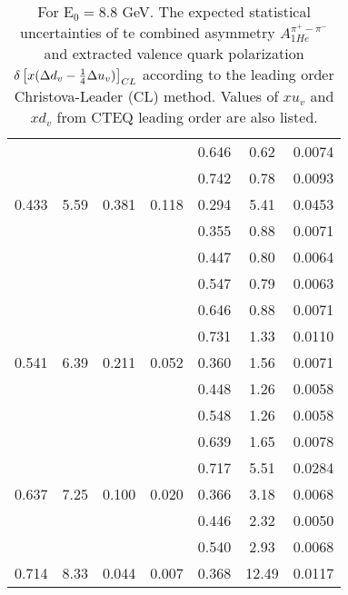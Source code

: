 \begin{table}[htbp]
\begin{center}
\begin{tabular}{|ccccc||c|c|}
         &          &          &          &    0.646 &      0.62 &    0.0074 \\
         &          &          &          &    0.742 &      0.78 &    0.0093 \\
   0.433 &    5.59 &   0.381 &    0.118 &    0.294 &      5.41 &    0.0453 \\
         &          &          &          &    0.355 &      0.88 &    0.0071 \\
         &          &          &          &    0.447 &      0.80 &    0.0064 \\
         &          &          &          &    0.547 &      0.79 &    0.0063 \\
         &          &          &          &    0.646 &      0.88 &    0.0071 \\
         &          &          &          &    0.731 &      1.33 &    0.0110 \\
   0.541 &    6.39 &   0.211 &    0.052 &    0.360 &      1.56 &    0.0071 \\
         &          &          &          &    0.448 &      1.26 &    0.0058 \\
         &          &          &          &    0.548 &      1.26 &    0.0058 \\
         &          &          &          &    0.639 &      1.65 &    0.0078 \\
         &          &          &          &    0.717 &      5.51 &    0.0284 \\
   0.637 &    7.25 &   0.100 &    0.020 &    0.366 &      3.18 &    0.0068 \\
         &          &          &          &    0.446 &      2.32 &    0.0050 \\
         &          &          &          &    0.540 &      2.93 &    0.0068 \\
   0.714 &    8.33 &   0.044 &    0.007 &    0.368 &     12.49 &    0.0117 \\
\hline
\end{tabular}
\end{center}
\caption{\label{tab:ddv2}  For E$_0=8.8 $ GeV. 
The expected statistical uncertainties of te combined asymmetry  $A_{1He}^{\pi^+ - \pi^-}$ and  extracted valence quark polarization $\delta \left[x( \Delta d_v -{1 \over 4} \Delta u_v) \right]_{CL}$
according to the leading order Christova-Leader (CL) method. Values of $x u_v$ and $x d_v$ from CTEQ leading order are also listed.
}
\end{table}
